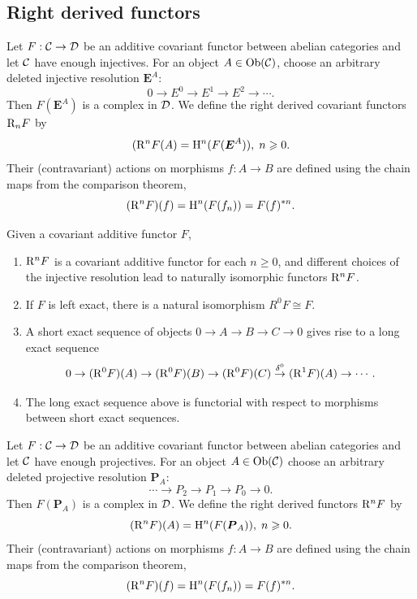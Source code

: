 \subsection{Right derived functors}

\begin{defn}
    Let $F:\mathcal{C}\to \mathcal{D}$ be an additive covariant functor between abelian categories and let $\mathcal{C}$ have enough injectives. For an object $A\in\operatorname{Ob}(\mathcal{C})$, choose an arbitrary deleted injective resolution $\bm{E}^A$:
    \[0\to E^0\to E^1\to E^2\to\cdots.\]
    Then $F(\bm{E}^A)$ is a complex in $\mathcal{D}$. We define the right derived covariant functors $\mathrm{R}_nF$ by
    \[(\mathrm{R}^nF(A)=\mathrm{H}^n(F(\boldsymbol{E}^A)),\; n\geqslant 0.\]
    Their (contravariant) actions on morphisms $f:A\to B$ are defined using the chain maps from the comparison theorem,
    \[(\mathrm{R}^nF)(f)=\mathrm{H}^n(F(f_n))=F(f)^{\ast n}.\]
\end{defn}

\begin{thm}
    Given a covariant additive functor $F$, 
    \begin{enumerate}
        \item $\mathrm{R}^nF$ is a covariant additive functor for each $n\geq 0$, and different choices of the injective resolution lead to naturally isomorphic functors $\mathrm{R}^nF$.
        \item If $F$ is left exact, there is a natural isomorphism $R^0F\cong F$.
        \item A short exact sequence of objects $0\to A\to B\to C\to 0$ gives rise to a long exact sequence
        \[0\to (\mathrm{R}^0F)(A)\to (\mathrm{R}^0F)(B)\to (\mathrm{R}^0F)(C)\overset{\delta^0}{\to} (\mathrm{R}^1F)(A)\to \cdots.\]
        \item The long exact sequence above is functorial with respect to morphisms between short exact sequences.
    \end{enumerate}
\end{thm}

\begin{defn}
    Let $F:\mathcal{C}\to \mathcal{D}$ be an additive covariant functor between abelian categories and let $\mathcal{C}$ have enough projectives. For an object $A\in \operatorname{Ob}(\mathcal{C})$ choose an arbitrary deleted projective resolution $\bm{P}_A$:
    \[\cdots \to P_2\to P_1\to P_0 \to 0.\]
    Then $F(\bm{P}_A)$ is a complex in $\mathcal{D}$. We define the right derived functors $\mathrm{R}^nF$ by 
    \[(\mathrm{R}^n F) (A)=\mathrm{H}^n(F(\boldsymbol{P}_A)), \; n\geqslant 0.\]
    Their (contravariant) actions on morphisms $f:A\to B$ are defined using the chain maps from the comparison theorem, \[(\mathrm{R}^n F)(f)=\mathrm{H}^n(F(f_n))=F(f)^{\ast n}.\]
\end{defn}

